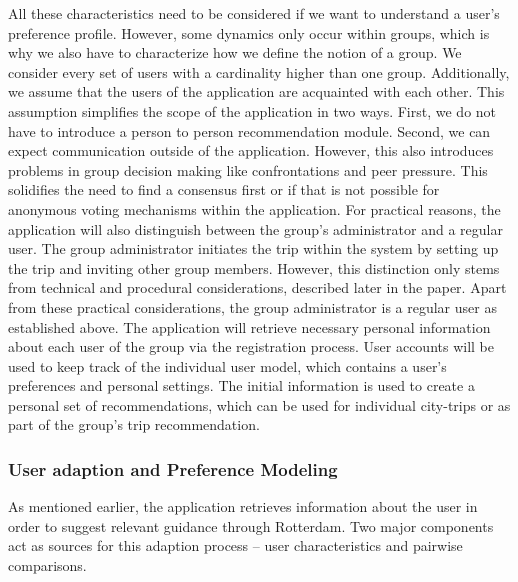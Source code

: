 \documentclass[11pt,a4paper,oneside]{article}
\begin{document}
All these characteristics need to be considered if we want to understand a user's preference profile. However, some dynamics only occur within groups, which is why we also have to characterize how we define the notion of a group. We consider every set of users with a cardinality higher than one group. Additionally, we assume that the users of the application are acquainted with each other. This assumption simplifies the scope of the application in two ways. First, we do not have to introduce a person to person recommendation module. Second, we can expect communication outside of the application. However, this also introduces problems in group decision making like confrontations and peer pressure.\cite{asch_OpinionsSocialPressure_1955}\cite{gitelson_InfluenceFriendsRelatives_1995} This solidifies the need to find a consensus first or if that is not possible for anonymous voting mechanisms within the application.
For practical reasons, the application will also distinguish between the group's administrator and a regular user. The group administrator initiates the trip within the system by setting up the trip and inviting other group members. However, this distinction only stems from technical and procedural considerations, described later in the paper. Apart from these practical considerations, the group administrator is a regular user as established above. 
The application will retrieve necessary personal information about each user of the group via the registration process. User accounts will be used to keep track of the individual user model, which contains a user's preferences and personal settings. The initial information is used to create a personal set of recommendations, which can be used for individual city-trips or as part of the group's trip recommendation.
  	
\subsubsection{User adaption and Preference Modeling}
As mentioned earlier, the application retrieves information about the user in order to suggest relevant guidance through Rotterdam. Two major components act as sources for this adaption process -- user characteristics and pairwise comparisons. 
\end{document}

